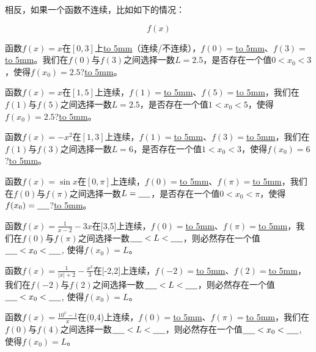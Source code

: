 \documentclass[UTF8]{ctexart}
\begin{document}
相反，如果一个函数不连续，比如如下的情况：
\begin{center}
\[f(x)\]
\end{center}
函数$f(x) = x$在$[0,3]$上\underline{\hbox to 5mm{}}（连续/不连续），$f(0) = $\underline{\hbox to 5mm{}}、$f(3) = $\underline{\hbox to 5mm{}}。我们在$f(0)$与$f(3)$之间选择一数$L = 2.5$，是否存在一个值$0<x_0<3$，使得$f(x_0) = 2.5$?\underline{\hbox to 5mm{}}。

函数$f(x) = x$在$[1,5]$上连续，$f(1) = $\underline{\hbox to 5mm{}}、$f(5) = $\underline{\hbox to 5mm{}}，我们在$f(1)$与$f(5)$之间选择一数$L = 2.5$，是否存在一个值$1<x_0<5$，使得$f(x_0) = 2.5$?\underline{\hbox to 5mm{}}。


函数$f(x) = -x^2$在$[1,3]$上连续，$f(1) = $\underline{\hbox to 5mm{}}、$f(3) = $\underline{\hbox to 5mm{}}，我们在$f(1)$与$f(3)$之间选择一数$L = 6$，是否存在一个值$1<x_0<3$，使得$f(x_0) = 6$?\underline{\hbox to 5mm{}}。


函数$f(x) = \sin{x}$在$[0, \pi]$上连续，$f(0) = $\underline{\hbox to 5mm{}}、$f(\pi) = $\underline{\hbox to 5mm{}}，我们在$f(0)$与$f(\pi)$之间选择一数$L = \underline{\hbox to 5mm{}}$，是否存在一个值$0<x_0<\pi$，使得$f(x_0) = \underline{\hbox to 5mm{}}$?\underline{\hbox to 5mm{}}。

函数$f(x) = \frac{1}{x-2} -3x$在[3,5]上连续，$f(0) = $\underline{\hbox to 5mm{}}、$f(\pi) = $\underline{\hbox to 5mm{}}，我们在$f(0)$与$f(\pi)$之间选择一数$\underline{\hbox to 5mm{}}<L< \underline{\hbox to 5mm{}}$，则必然存在一个值$\underline{\hbox to 5mm{}}<x_0< \underline{\hbox to 5mm{}}$, 使得$f(x_0) = L$。

函数$f(x) = \frac{1}{|x|+2} -\frac{x^2}{3}$在[-2,2]上连续，$f(-2) = $\underline{\hbox to 5mm{}}、$f(2) = $\underline{\hbox to 5mm{}}，我们在$f(-2)$与$f(2)$之间选择一数$\underline{\hbox to 5mm{}}<L< \underline{\hbox to 5mm{}}$，则必然存在一个值$\underline{\hbox to 5mm{}}<x_0< \underline{\hbox to 5mm{}}$, 使得$f(x_0) = L$。

函数$f(x) = \frac{10^x-1}{x}$在(0,4)上连续，$f(0) = $\underline{\hbox to 5mm{}}、$f(\pi) = $\underline{\hbox to 5mm{}}，我们在$f(0)$与$f(4)$之间选择一数$\underline{\hbox to 5mm{}}<L< \underline{\hbox to 5mm{}}$，则必然存在一个值$\underline{\hbox to 5mm{}}<x_0< \underline{\hbox to 5mm{}}$, 使得$f(x_0) = L$。
\end{document}
